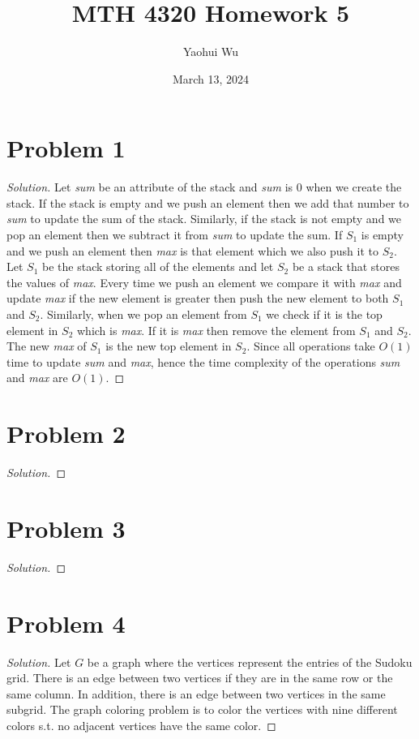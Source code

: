 \documentclass[12pt]{article}
\title{MTH 4320 Homework 5}
\author{Yaohui Wu}
\date{March 13, 2024}
\newenvironment*{solution}{\begin{proof}[Solution]}{\end{proof}}
\begin{document}
\maketitle
\section*{Problem 1}
\begin{solution}
    Let \textit{sum} be an attribute of the stack and \textit{sum} is 0 when
    we create the stack. If the stack is empty and we push an element then we
    add that number to \textit{sum} to update the sum of the stack. Similarly,
    if the stack is not empty and we pop an element then we subtract it from
    \textit{sum} to update the sum. If \(S_1\) is empty and we push an element
    then \textit{max} is that element which we also push it to \(S_2\). Let \(
    S_1\) be the stack storing all of the elements and let \(S_2\) be a stack
    that stores the values of \textit{max}. Every time we push an element we
    compare it with \textit{max} and update \textit{max} if the new element is
    greater then push the new element to both \(S_1\) and \(S_2\). Similarly,
    when we pop an element from \(S_1\) we check if it is the top element in
    \(S_2\) which is \textit{max}. If it is \textit{max} then remove the
    element from \(S_1\) and \(S_2\). The new \textit{max} of \(S_1\) is the
    new top element in \(S_2\). Since all operations take \(O(1)\) time to
    update \textit{sum} and \textit{max}, hence the time complexity of the
    operations \textit{sum} and \textit{max} are \(O(1)\).
\end{solution}
\section*{Problem 2}
\begin{solution}
    
\end{solution}
\section*{Problem 3}
\begin{solution}
    
\end{solution}
\section*{Problem 4}
\begin{solution}
    Let \(G\) be a graph where the vertices represent the entries of the
    Sudoku grid. There is an edge between two vertices if they are in the same
    row or the same column. In addition, there is an edge between two vertices
    in the same subgrid. The graph coloring problem is to color the vertices
    with nine different colors s.t. no adjacent vertices have the same color.
\end{solution}
\end{document}
